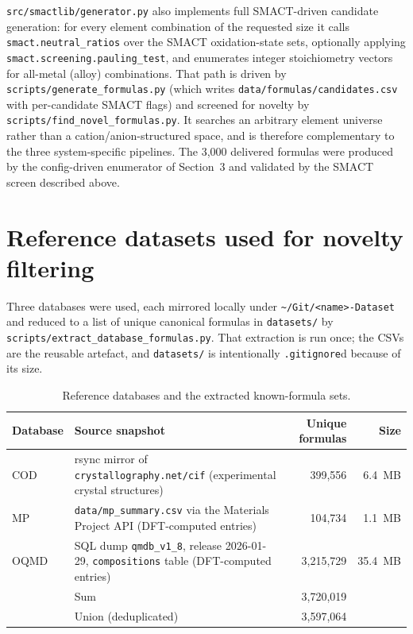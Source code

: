 \documentclass[11pt,a4paper]{article}
\newcommand{\pkg}[1]{\texttt{#1}}
\newcommand{\code}[1]{\texttt{#1}}
\newcommand{\cmd}[1]{\texttt{\small #1}}
\begin{document}
\pkg{src/smactlib/generator.py} also implements full SMACT-driven candidate generation: for every
element combination of the requested size it calls \code{smact.neutral\_ratios} over the SMACT
oxidation-state sets, optionally applying \code{smact.screening.pauling\_test}, and enumerates
integer stoichiometry vectors for all-metal (alloy) combinations. That path is driven by
\cmd{scripts/generate\_formulas.py} (which writes \code{data/formulas/candidates.csv} with
per-candidate SMACT flags) and screened for novelty by \cmd{scripts/find\_novel\_formulas.py}.
It searches an arbitrary element universe rather than a cation/anion-structured space, and is
therefore complementary to the three system-specific pipelines. The 3{,}000 delivered formulas
were produced by the config-driven enumerator of Section~3 and validated by the SMACT screen
described above.

\section{Reference datasets used for novelty filtering}

Three databases were used, each mirrored locally under \code{\textasciitilde/Git/<name>-Dataset}
and reduced to a list of unique canonical formulas in \code{datasets/} by
\cmd{scripts/extract\_database\_formulas.py}. That extraction is run once; the CSVs are the
reusable artefact, and \code{datasets/} is intentionally \code{.gitignore}d because of its size.

\begin{table}[h]
\centering
\footnotesize
\begin{tabular}{@{}l p{7.4cm} r r@{}}
\toprule
Database & Source snapshot & Unique formulas & Size\\
\midrule
COD~\cite{cod} & rsync mirror of \code{crystallography.net/cif} (experimental crystal structures) & 399{,}556 & \SI{6.4}{MB}\\
MP~\cite{mp_apl,mp_api} & \code{data/mp\_summary.csv} via the Materials Project API (DFT-computed entries) & 104{,}734 & \SI{1.1}{MB}\\
OQMD~\cite{oqmd} & SQL dump \code{qmdb\_v1\_8}, release 2026-01-29, \code{compositions} table (DFT-computed entries) & 3{,}215{,}729 & \SI{35.4}{MB}\\
\midrule
 & Sum & 3{,}720{,}019 & \\
 & Union (deduplicated) & 3{,}597{,}064 & \\
\bottomrule
\end{tabular}
\caption{Reference databases and the extracted known-formula sets.}
\label{tab:datasets}
\end{table}
\end{document}
